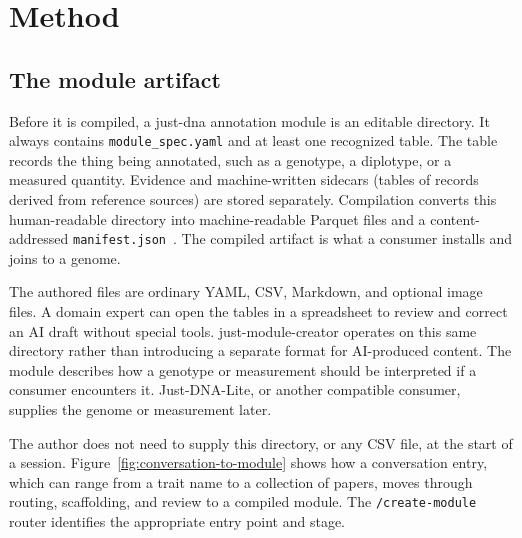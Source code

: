 \documentclass[11pt,a4paper]{article}
\begin{document}
\section{Method}

\subsection{The module artifact}

Before it is compiled, a just-dna annotation module is an editable
directory. It always contains
\texttt{module\_spec.yaml} and at least one recognized table. The table records
the thing being annotated, such as a genotype, a diplotype, or a measured
quantity. Evidence and machine-written sidecars (tables of records derived from
reference sources) are stored separately.
Compilation converts this human-readable directory into machine-readable
Parquet files and a content-addressed
\texttt{manifest.json}~\citep{justdnaformat2026}. The compiled artifact is what
a consumer installs and joins to a genome.

The authored files are ordinary YAML, CSV, Markdown, and optional image files.
A domain expert can open the tables in a spreadsheet to review and correct an AI
draft without special tools. just-module-creator
operates on this same directory rather than introducing a separate format for
AI-produced content. The module describes how a genotype or measurement should be
interpreted if a consumer encounters it. Just-DNA-Lite, or another compatible
consumer, supplies the genome or measurement later.

The author does not need to supply this directory, or any CSV file, at the
start of a session. Figure~\ref{fig:conversation-to-module} shows how a
conversation entry, which can range from a trait name to a collection of
papers, moves through routing, scaffolding, and review to a compiled module.
The \texttt{/create-module} router identifies the appropriate entry point
and stage.
\end{document}
